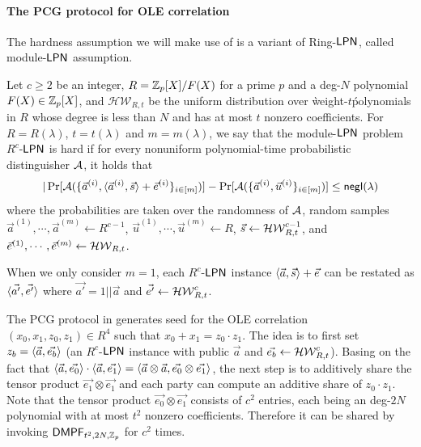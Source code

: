 \paragraph{The PCG protocol for OLE correlation}The hardness assumption we will make use of is a variant of Ring-${\sf LPN}$, called module-${\sf LPN}$ assumption. 
\begin{definition}\label{def:module-LPN}
    Let $c\ge 2$ be an integer, $R = \mathbb{Z}_p[X]/F(X)$ for a prime $p$ and a deg-$N$ polynomial $F(X)\in \mathbb{Z}_p[X]$, and $\mathcal{HW}_{R,t}$ be the uniform distribution over \`weight-$t$\' polynomials in $R$ whose degree is less than $N$ and has at most $t$ nonzero coefficients. 
     For $R=R(\lambda)$, $t=t(\lambda)$ and $m=m(\lambda)$, we say that the module-${\sf LPN}$ problem $R^c$-${\sf LPN}$ is hard if for every nonuniform polynomial-time probabilistic distinguisher $\mathcal{A}$, it holds that 
    \[
        |\Pr[\mathcal{A}(\{\vec{a}^{(i)}, \langle \vec{a}^{(i)}, \vec{s} \rangle+\vec{e}^{(i)}\}_{i\in [m]})] - \Pr[\mathcal{A}(\{\vec{a}^{(i)},\vec{u}^{(i)}\}_{i\in [m]})] \le \mathsf{negl}(\lambda)
    \]
    where the probabilities are taken over the randomness of $\mathcal{A}$, random samples $\vec{a}^{(1)},\cdots, \vec{a}^{(m)}\leftarrow R^{c-1}$, $\vec{u}^{(1)},\cdots, \vec{u}^{(m)}\leftarrow R$, $\vec{s}\leftarrow \mathcal{HW}_{R,t}^{c-1}$, and $\vec{e}^{(1)},\cdots, \vec{e}^{(m)}\leftarrow \mathcal{HW}_{R,t}$. 

    When we only consider $m=1$, each $R^c$-${\sf LPN}$ instance $ \langle \vec{a}, \vec{s} \rangle+\vec{e}$ can be restated as $\langle \vec{a'}, \vec{e'} \rangle$ where $\vec{a'}=1||\vec{a}$ and $\vec{e'}\leftarrow \mathcal{HW}_{R,t}^c$. 
\end{definition}

The PCG protocol in \cite{cryptoeprint:2022/1035} generates seed for the OLE correlation $(x_0,x_1,z_0,z_1)\in R^4$ such that $x_0+x_1 = z_0\cdot z_1$. The idea is to first set $z_b = \langle \vec{a}, \vec{e_b} \rangle$ (an $R^c$-${\sf LPN}$ instance with public $\vec{a}$ and $\vec{e_b}\leftarrow \mathcal{HW}_{R,t}^c$). Basing on the fact that $\langle \vec{a},  \vec{e_0} \rangle\cdot \langle \vec{a}, \vec{e_1} \rangle = \langle \vec{a}\otimes \vec{a}, \vec{e_0}\otimes \vec{e_1} \rangle$, the next step is to additively share the tensor product $\vec{e_1}\otimes \vec{e_1}$ and each party can compute an additive share of $z_0\cdot z_1$. Note that the tensor product $\vec{e_0}\otimes\vec{e_1}$ consists of $c^2$ entries, each being an deg-$2N$ polynomial with at most $t^2$ nonzero coefficients. Therefore it can be shared by invoking ${\sf DMPF}_{t^2, 2N, \mathbb{Z}_p}$ for $c^2$ times.

